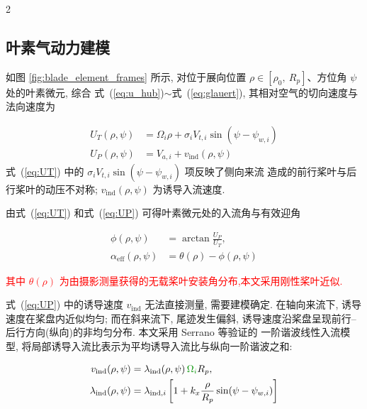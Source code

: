 \documentclass{aas}
\begin{document}
\begin{multicols}{2}%
\subsection{叶素气动力建模}
\label{subsec:rotation}
\label{subsec:blade_element}

如图 \ref{fig:blade_element_frames} 所示, 对位于展向位置 $\rho\in[\rho_0,\ R_p]$、方位角 $\psi$ 处的叶素微元, 综合
式~(\ref{eq:u_hub})$\sim$式~(\ref{eq:glauert}), 其相对空气的切向速度与法向速度为

\begin{align}
U_T(\rho,\psi)&=\Omega_i\rho+\sigma_i V_{t,i}\sin\!\left(\psi-\psi_{w,i}\right) \label{eq:UT}\\[2pt]
U_P(\rho,\psi)&=V_{a,i}+v_{\mathrm{ind}}(\rho,\psi) \label{eq:UP}
\end{align}
式~(\ref{eq:UT}) 中的 $\sigma_i V_{t,i}\sin(\psi-\psi_{w,i})$ 项反映了侧向来流
造成的前行桨叶与后行桨叶的动压不对称; $v_{\mathrm{ind}}(\rho,\psi)$
为诱导入流速度.

由式~(\ref{eq:UT}) 和式~(\ref{eq:UP}) 可得叶素微元处的入流角与有效迎角

\begin{equation}
\begin{aligned}
\phi(\rho,\psi)&=\arctan\frac{U_P}{U_T},\\
\alpha_{\mathrm{eff}}(\rho,\psi)&=\theta(\rho)-\phi(\rho,\psi)
\end{aligned}
\label{eq:aoa}
\end{equation}

\textcolor{red}{其中 $\theta(\rho)$ 为由摄影测量获得的无载桨叶安装角分布,本文采用刚性桨叶近似. }

\label{subsec:induced}

式~(\ref{eq:UP}) 中的诱导速度 $v_{\mathrm{ind}}$ 无法直接测量, 需要建模确定.
在轴向来流下, 诱导速度在桨盘内近似均匀; 而在斜来流下, 尾迹发生偏斜,
诱导速度沿桨盘呈现前行--后行方向(纵向)的非均匀分布. 本文采用 Serrano 等验证的
一阶谐波线性入流模型\cite{9}, 将局部诱导入流比表示为平均诱导入流比与纵向一阶谐波之和:

\begin{equation}
\begin{aligned}
v_{\mathrm{ind}}(\rho,\psi)&=\lambda_{\mathrm{ind}}(\rho,\psi)\,\textcolor{mygreen}{\Omega_{i}}R_p,\\
\lambda_{\mathrm{ind}}(\rho,\psi)&=\lambda_{\mathrm{ind},i}\left[1+k_x\frac{\rho}{R_p}\sin\!\left(\psi-\psi_{w,i}\right)\right]
\end{aligned}
\label{eq:ind_vel}
\end{equation}


\end{multicols}
\end{document}
